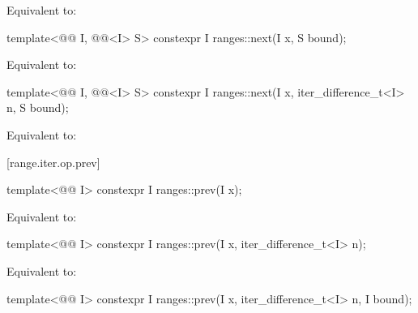 \begin{itemdescr}
\pnum
\effects
Equivalent to: 
\end{itemdescr}

%
\begin{itemdecl}
template<@@ I, @@<I> S>
  constexpr I ranges::next(I x, S bound);
\end{itemdecl}

\begin{itemdescr}
\pnum
\effects
Equivalent to: 
\end{itemdescr}

%
\begin{itemdecl}
template<@@ I, @@<I> S>
  constexpr I ranges::next(I x, iter_difference_t<I> n, S bound);
\end{itemdecl}

\begin{itemdescr}
\pnum
\effects
Equivalent to: 
\end{itemdescr}

[range.iter.op.prev]{}
%
\begin{itemdecl}
template<@@ I>
  constexpr I ranges::prev(I x);
\end{itemdecl}

\begin{itemdescr}
\pnum
\effects
Equivalent to: 
\end{itemdescr}

%
\begin{itemdecl}
template<@@ I>
  constexpr I ranges::prev(I x, iter_difference_t<I> n);
\end{itemdecl}

\begin{itemdescr}
\pnum
\effects
Equivalent to: 
\end{itemdescr}

%
\begin{itemdecl}
template<@@ I>
  constexpr I ranges::prev(I x, iter_difference_t<I> n, I bound);
\end{itemdecl}

